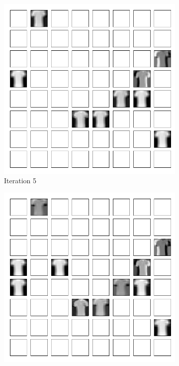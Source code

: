 {{\begin{minipage}[t]{\colwidth}
\begin{figure}[tb]
\begin{subfigure}[b]{\PicWidth}
\includegraphics[width=\textwidth,trim=0.35cm 0.35cm 0.2cm 0.35cm,clip]{atelier/FMNIST/FM_e5.pdf}%
\caption{Iteration 5}
\end{subfigure}
\hfill%
%
\begin{subfigure}[b]{\PicWidth}
\includegraphics[width=\textwidth,trim=0.35cm 0.35cm 0.2cm 0.35cm,clip]{atelier/FMNIST/FM_e20.pdf}%

\end{subfigure}
\end{figure}
\end{minipage}}}
